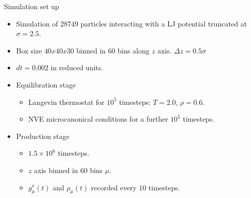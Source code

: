 \documentclass{beamer}
\begin{document}
 \begin{frame}{Simulation set up}
   \begin{itemize}
     \item Simulation of $28749$ particles interacting with a \alert{LJ potential} truncated at $\sigma=2.5$.
     \item Box size $40x40x30$ binned in $60$ bins along $z$ axis. \alert{$\Delta z=0.5\sigma$}
     \item $dt=0.002$ in reduced units.
     \item \alert{Equilibration stage}
       \begin{itemize}
         \item Langevin thermostat for $10^5$ timesteps: $T=2.0$, $\rho=0.6$.
         \item NVE microcanonical conditions for a further $10^5$ timesteps.
          \end{itemize}
        \item \alert{Production stage}
       \begin{itemize}
         \item $1.5\times10^6$ timesteps.
         \item $z$ axis binned in $60$ bins $\mu$.
         \item $g_{\mu}^x(t)$ and $\rho_{\mu}(t)$ recorded every $10$ timesteps. 
         \end{itemize}
     \end{itemize}
 \end{frame}
\end{document}

